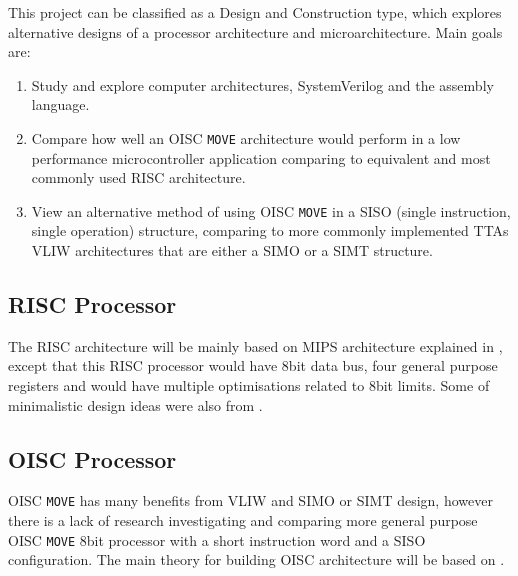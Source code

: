 \iffalse
This chapter describes your Goals and Objectives. 
Indicate how your work is intended to expand on previous historical work.
Present your motivations; why are you doing this?
Indicate the type of project you have(see the list above).

Types of Projects:
2) Design and Construction projects:
These types of projects involve the design and construction of some 
electrical or electronic apparatus or device within the bounds 
of the department's educational mandate.
\fi


This project can be classified as a Design and Construction type, which explores alternative designs of a processor architecture and microarchitecture. Main goals are:
\begin{enumerate}
	\item Study and explore computer architectures, SystemVerilog and the assembly language. 
	\item Compare how well an OISC \texttt{MOVE} architecture would perform in a low performance microcontroller application comparing to equivalent and most commonly used RISC architecture.
	\item View an alternative method of using OISC \texttt{MOVE} in a SISO (single instruction, single operation) structure, comparing to more commonly implemented TTAs VLIW architectures that are either a SIMO or a SIMT structure.
\end{enumerate}

\subsection{RISC Processor}
The RISC architecture will be mainly based on MIPS architecture explained in \autocite{harris_harris_2013}, except that this RISC processor would have 8bit data bus, four general purpose registers and would have multiple optimisations related to 8bit limits. Some of minimalistic design ideas were also from \autocite{gilreath_laplante_2003}.


\subsection{OISC Processor}
OISC \texttt{MOVE} has many benefits from VLIW and SIMO or SIMT design, however there is a lack of research investigating and comparing more general purpose OISC \texttt{MOVE} 8bit processor with a short instruction word and a SISO configuration. The main theory for building OISC architecture will be based on \autocite{gilreath_laplante_2003}.


